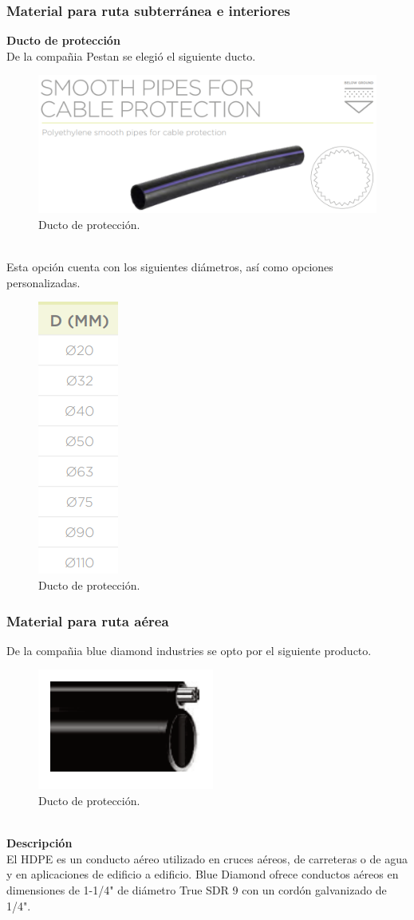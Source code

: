 \documentclass[12pt,letterpaper]{article}
\begin{document}
\subsubsection{Material para ruta subterránea e interiores}
\textbf{Ducto de protección}
\\
De la compañia Pestan se elegió el siguiente ducto.
\begin{figure}[ht]
    \centering
    \includegraphics[width=.5\textwidth]{f13.png}
    \caption{Ducto de protección.}
\end{figure}
\\
Esta opción cuenta con los siguientes diámetros, así como opciones personalizadas.
\begin{figure}[ht]
    \centering
    \includegraphics[width=.1\textwidth]{f14.png}
    \caption{Ducto de protección.}
\end{figure}

\subsubsection{Material para ruta aérea}
De la compañia blue diamond industries se opto por el siguiente producto.
\begin{figure}[ht]
    \centering
    \includegraphics[width=.5\textwidth]{f15.png}
    \caption{Ducto de protección.}
\end{figure}
\\
\textbf{Descripción}
\\
El HDPE es un conducto aéreo utilizado en cruces aéreos, de carreteras o de agua 
y en aplicaciones de edificio a edificio. Blue Diamond ofrece conductos aéreos en 
dimensiones de 1-1/4" de diámetro True SDR 9 con un cordón galvanizado de 1/4".
\end{document}
